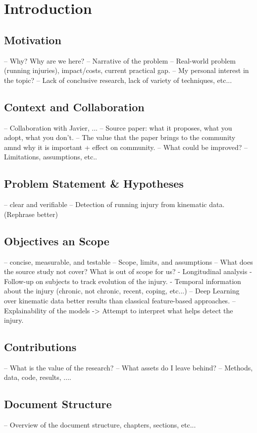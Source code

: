 \chapter{Introduction}\label{chap:introduction}

\section{Motivation}\label{sec:intro-motivation}
-- Why? Why are we here?
-- Narrative of the problem
-- Real-world problem (running injuries), impact/costs, current practical gap.
-- My personal interest in the topic?
-- Lack of conclusive research, lack of variety of techniques, etc...

\section{Context and Collaboration}\label{sec:intro-context}
-- Collaboration with Javier, ...
-- Source paper: what it proposes, what you adopt, what you don't.
    -- The value that the paper brings to the community amnd why it is important + effect on community.
    -- What could be improved?
    -- Limitations, assumptions, etc..

\section{Problem Statement \& Hypotheses}\label{sec:intro-problem-hypotheses}
-- clear and verifiable
-- Detection of running injury from kinematic data. (Rephrase better)


\section{Objectives an Scope}\label{sec:intro-objectives-scope}
-- concise, measurable, and testable
-- Scope, limits, and assumptions
-- What does the source study not cover? What is out of scope for us?
    - Longitudinal analysis
    - Follow-up on subjects to track evolution of the injury.
    - Temporal information about the injury (chronic, not chronic, recent, coping, etc...)
-- Deep Learning over kinematic data better results than classical feature-based approaches.
-- Explainability of the models -> Attempt to interpret what helps detect the injury.


\section{Contributions}\label{sec:intro-contributions}
-- What is the value of the research?
-- What assets do I leave behind?
-- Methods, data, code, results, ....

\section{Document Structure}\label{sec:intro-structure}
-- Overview of the document structure, chapters, sections, etc...
